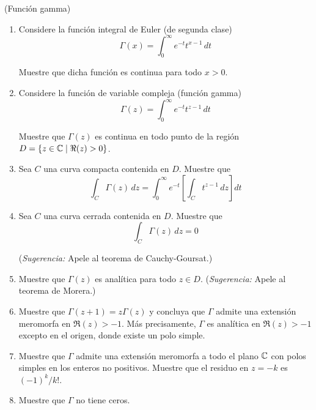 \begin{exercise}
(Función gamma)
\begin{enumerate}[label=\alph*)]
    \item Considere la función integral de Euler (de segunda clase)
    $$\Gamma(x) = \int_0^\infty e^{-t} t^{x-1} \, dt$$
    
    Muestre que dicha función es continua para todo $x > 0$.
    
    \item Considere la función de variable compleja (función gamma)
    $$\Gamma(z) = \int_0^\infty e^{-t} t^{z-1} \, dt$$
    
    Muestre que $\Gamma(z)$ es continua en todo punto de la región $D = \{ z \in \mathbb C \mid \Re(z) > 0 \}$.
    
    \item Sea $C$ una curva compacta contenida en $D$. Muestre que
    $$\int_C \Gamma(z) \, dz = \int_0^\infty e^{-t} \left[ \int_C t^{z-1} \, dz \right] dt$$
    
    \item Sea $C$ una curva cerrada contenida en $D$. Muestre que
    $$\int_C \Gamma(z) \, dz = 0$$
    
    (\textit{Sugerencia:} Apele al teorema de Cauchy-Goursat.)
    
    \item Muestre que $\Gamma(z)$ es analítica para todo $z \in D$. (\textit{Sugerencia:} Apele al teorema de Morera.)
    
    \item Muestre que $\Gamma(z + 1) = z \Gamma(z)$ y concluya que $\Gamma$ admite una extensión meromorfa en $\Re(z) > -1$. Más precisamente, $\Gamma$ es analítica en $\Re(z) > -1$ excepto en el origen, donde existe un polo simple.
    
    \item Muestre que $\Gamma$ admite una extensión meromorfa a todo el plano $\mathbb C$ con polos simples en los enteros no positivos. Muestre que el residuo en $z = -k$ es $(-1)^k / k!$.
    
    \item Muestre que $\Gamma$ no tiene ceros.
\end{enumerate}
\end{exercise}

